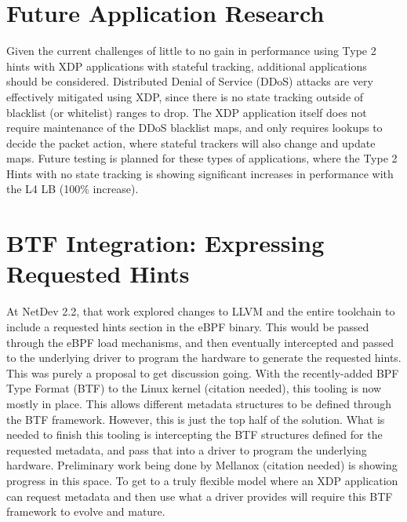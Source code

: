 \documentclass[letterpaper]{article}
\begin{document}
\section{Future Application Research}
Given the current challenges of little to no gain in performance using Type 2 hints with XDP applications with stateful tracking, additional applications should be considered.  Distributed Denial of Service (DDoS) attacks are very effectively mitigated using XDP, since there is no state tracking outside of blacklist (or whitelist) ranges to drop.  The XDP application itself does not require maintenance of the DDoS blacklist maps, and only requires lookups to decide the packet action, where stateful trackers will also change and update maps.
\newline
\newline
Future testing is planned for these types of applications, where the Type 2 Hints with no state tracking is showing significant increases in performance with the L4 LB (100\% increase).

\section{BTF Integration: Expressing Requested Hints}
At NetDev 2.2, that work explored changes to LLVM and the entire toolchain to include a requested hints section in the eBPF binary.  This would be passed through the eBPF load mechanisms, and then eventually intercepted and passed to the underlying driver to program the hardware to generate the requested hints.  This was purely a proposal to get discussion going.
\newline
\newline
With the recently-added BPF Type Format (BTF) to the Linux kernel (citation needed), this tooling is now mostly in place.  This allows different metadata structures to be defined through the BTF framework.  However, this is just the top half of the solution.
\newline
\newline
What is needed to finish this tooling is intercepting the BTF structures defined for the requested metadata, and pass that into a driver to program the underlying hardware.  Preliminary work being done by Mellanox (citation needed) is showing progress in this space.  To get to a truly flexible model where an XDP application can request metadata and then use what a driver provides will require this BTF framework to evolve and mature.
\end{document}
